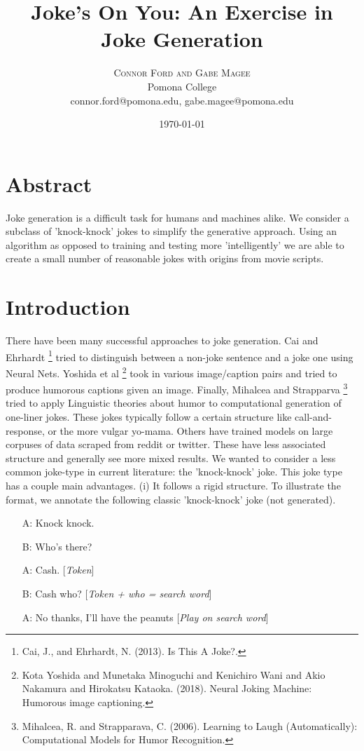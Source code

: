 \documentclass[twoside,twocolumn]{article}
\title{Joke's On You: An Exercise in Joke Generation}
\author{%
\textsc{Connor Ford and Gabe Magee} \\[1ex] 
\normalsize Pomona College \\ 
\normalsize connor.ford@pomona.edu, gabe.magee@pomona.edu
}
\date{\today}
\begin{document}
\maketitle

\section*{Abstract}

Joke generation is a difficult task for humans and machines alike. 
We consider a subclass of 'knock-knock' jokes to simplify the generative approach.
Using an algorithm as opposed to training and testing more 'intelligently' we are able to create a small number of reasonable jokes with origins from movie scripts.

\section{Introduction}

There have been many successful approaches to joke generation. 
Cai and Ehrhardt \footnote{Cai, J., and Ehrhardt, N. (2013). Is This A Joke?.} tried to distinguish between a non-joke sentence and a joke one using Neural Nets. 
Yoshida et al \footnote{Kota Yoshida and Munetaka Minoguchi and Kenichiro Wani and Akio Nakamura and Hirokatsu Kataoka. (2018). Neural Joking Machine: Humorous image captioning.} took in various image/caption pairs and tried to produce humorous captions given an image. 
Finally, Mihalcea and Strapparva \footnote{Mihalcea, R. and Strapparava, C. (2006). Learning to Laugh (Automatically): Computational Models for Humor Recognition.} tried to apply Linguistic theories about humor to computational generation of one-liner jokes. 
These jokes typically follow a certain structure like call-and-response, or the more vulgar yo-mama. 
Others have trained models on large corpuses of data scraped from reddit or twitter. These have less associated structure and generally see more mixed results.
We wanted to consider a less common joke-type in current literature: the 'knock-knock' joke. This joke type has a couple main advantages.
(i) It follows a rigid structure. To illustrate the format, we annotate the following classic 'knock-knock' joke (not generated).
\begin{center}
\begin{enumerate}
\item[A:] Knock knock.
\item[B:] Who's there?
\item[A:] Cash. [\emph{Token}]
\item[B:] Cash who? [\emph{Token + who = search word}]
\item[A:] No thanks, I'll have the peanuts [\emph{Play on search word}]
\end{enumerate}
\end{center}
\end{document}
